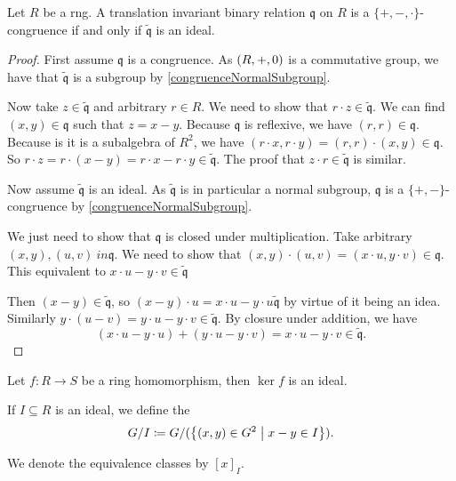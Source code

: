 \begin{proposition} \label{congruenceRingIdeals}
Let $R$ be a rng. A translation invariant binary relation $\mathfrak{q}$ on $R$ is a $\{+,-,\cdot\}$-congruence \textup{if and only if} $\widetilde{\mathfrak{q}}$ is an ideal.
\end{proposition}
\begin{proof}
First assume $\mathfrak{q}$ is a congruence. As $\left( R,+,0 \right)$ is a commutative group, we have that $\widetilde{\mathfrak{q}}$ is a subgroup by \ref{congruenceNormalSubgroup}.

Now take $z\in\widetilde{\mathfrak{q}}$ and arbitrary $r\in R$. We need to show that $r\cdot z \in \widetilde{\mathfrak{q}}$. We can find $(x,y)\in \mathfrak{q}$ such that $z = x-y$. Because $\mathfrak{q}$ is reflexive, we have $(r,r)\in\mathfrak{q}$. Because is it is a subalgebra of $R^2$, we have $(r\cdot x,r\cdot y) = (r,r)\cdot (x,y)\in \mathfrak{q}$. So $r\cdot z = r\cdot (x-y) = r\cdot x - r\cdot y \in \widetilde{\mathfrak{q}}$. The proof that $z\cdot r\in \widetilde{\mathfrak{q}}$ is similar.

Now assume $\widetilde{\mathfrak{q}}$ is an ideal. As $\widetilde{\mathfrak{q}}$ is in particular a normal subgroup, $\mathfrak{q}$ is a $\{+,-\}$-congruence by \ref{congruenceNormalSubgroup}.

We just need to show that $\mathfrak{q}$ is closed under multiplication. Take arbitrary $(x,y), (u,v)\ in \mathfrak{q}$. We need to show that $(x,y)\cdot (u,v) = (x\cdot u, y\cdot v)\in\mathfrak{q}$. This equivalent to $x\cdot u - y\cdot v \in \widetilde{\mathfrak{q}}$


Then $(x-y)\in \widetilde{\mathfrak{q}}$, so $(x-y)\cdot u = x\cdot u - y\cdot u \widetilde{\mathfrak{q}}$ by virtue of it being an idea. Similarly $y\cdot (u-v) = y\cdot u - y \cdot v \in \widetilde{\mathfrak{q}}$. By closure under addition, we have
\[ (x\cdot u - y\cdot u) + (y\cdot u - y \cdot v) = x\cdot u - y\cdot v \in \widetilde{\mathfrak{q}}. \]
\end{proof}
\begin{corollary} \label{kernelIsIdeal}
Let $f: R\to S$ be a ring homomorphism, then $\ker f$ is an ideal.
\end{corollary}

\begin{definition}
If $I\subseteq R$ is an ideal, we define the 
\[ G/I \coloneqq G/(\left\{ (x,y)\in G^2 \;\middle|\; x-y\in I \right\}). \]

We denote the equivalence classes by $[x]_I$.
\end{definition}

